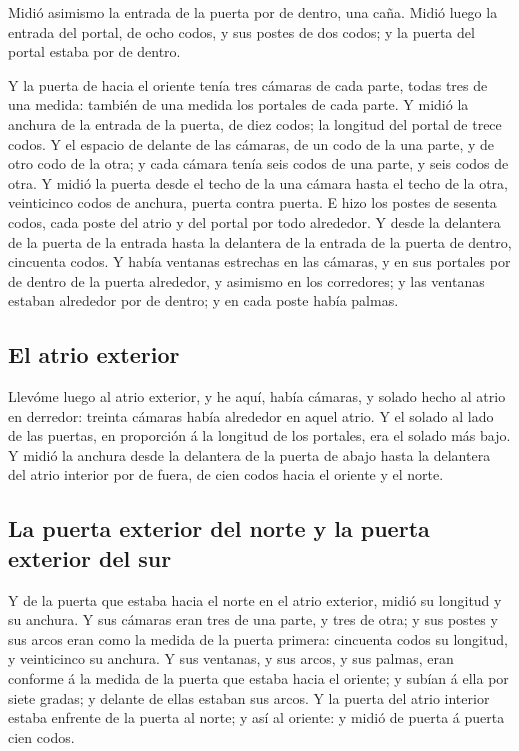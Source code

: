  Midió asimismo la entrada de la puerta por de dentro, una
caña.  Midió luego la entrada del portal, de ocho codos, y
sus postes de dos codos; y la puerta del portal estaba por de dentro.

 Y la puerta de hacia el oriente tenía tres cámaras de cada
parte, todas tres de una medida: también de una medida los portales de
cada parte.  Y midió la anchura de la entrada de la puerta,
de diez codos; la longitud del portal de trece codos.  Y el
espacio de delante de las cámaras, de un codo de la una parte, y de otro
codo de la otra; y cada cámara tenía seis codos de una parte, y seis
codos de otra.  Y midió la puerta desde el techo de la una
cámara hasta el techo de la otra, veinticinco codos de anchura, puerta
contra puerta.  E hizo los postes de sesenta codos, cada
poste del atrio y del portal por todo alrededor.  Y desde
la delantera de la puerta de la entrada hasta la delantera de la entrada
de la puerta de dentro, cincuenta codos.  Y había ventanas
estrechas en las cámaras, y en sus portales por de dentro de la puerta
alrededor, y asimismo en los corredores; y las ventanas estaban
alrededor por de dentro; y en cada poste había palmas.

\hypertarget{el-atrio-exterior}{%
\subsection{El atrio exterior}\label{el-atrio-exterior}}

 Llevóme luego al atrio exterior, y he aquí, había cámaras,
y solado hecho al atrio en derredor: treinta cámaras había alrededor en
aquel atrio.  Y el solado al lado de las puertas, en
proporción á la longitud de los portales, era el solado más bajo.
 Y midió la anchura desde la delantera de la puerta de
abajo hasta la delantera del atrio interior por de fuera, de cien codos
hacia el oriente y el norte.

\hypertarget{la-puerta-exterior-del-norte-y-la-puerta-exterior-del-sur}{%
\subsection{La puerta exterior del norte y la puerta exterior del
sur}\label{la-puerta-exterior-del-norte-y-la-puerta-exterior-del-sur}}

 Y de la puerta que estaba hacia el norte en el atrio
exterior, midió su longitud y su anchura.  Y sus cámaras
eran tres de una parte, y tres de otra; y sus postes y sus arcos eran
como la medida de la puerta primera: cincuenta codos su longitud, y
veinticinco su anchura.  Y sus ventanas, y sus arcos, y sus
palmas, eran conforme á la medida de la puerta que estaba hacia el
oriente; y subían á ella por siete gradas; y delante de ellas estaban
sus arcos.  Y la puerta del atrio interior estaba enfrente
de la puerta al norte; y así al oriente: y midió de puerta á puerta cien
codos.

